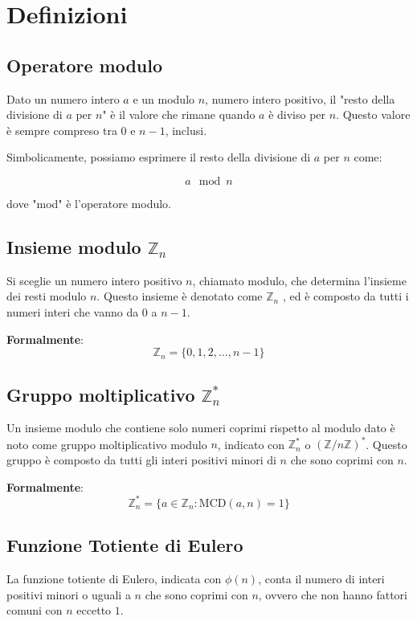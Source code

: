 \documentclass[a4paper,12pt]{report}
\begin{document}
\section{Definizioni} 
\subsection*{Operatore modulo} Dato un numero intero $a$ e un modulo $n$, numero intero positivo, il "resto della divisione di $a$ per $n$" è il valore che rimane quando $a$ è diviso per $n$. Questo valore è sempre compreso tra 0 e $n-1$, inclusi.

Simbolicamente, possiamo esprimere il resto della divisione di $a$ per $n$ come:

\[ a \mod n \]

dove "mod" è l'operatore modulo.

\subsection*{Insieme modulo \( \mathbb{Z}_n\)}
Si sceglie un numero intero positivo \(n\), chiamato modulo, che determina l'insieme dei resti modulo \(n\). 
Questo insieme è denotato come \(\mathbb{Z}_n\)  , ed è composto da tutti i numeri interi che vanno da 0 a \(n-1\).

\textbf{Formalmente}: \[\mathbb{Z}_n = \{0, 1, 2, \ldots, n-1\}\]

\subsection*{Gruppo moltiplicativo \(\mathbb{Z}_n^*\)}
Un insieme modulo che contiene solo numeri coprimi rispetto al modulo dato è noto come gruppo moltiplicativo modulo \(n\), indicato con \(\mathbb{Z}_n^*\) o \((\mathbb{Z}/n\mathbb{Z})^*\). 
Questo gruppo è composto da tutti gli interi positivi minori di \(n\) che sono coprimi con \(n\).

\textbf{Formalmente}: \[\mathbb{Z}_n^* = \{a \in \mathbb{Z}_n : \text{MCD}(a, n) = 1\}\]

\subsection*{Funzione Totiente di Eulero} \label{sec:totiente}
La funzione totiente di Eulero, indicata con $\phi(n)$, conta il numero di interi positivi minori o uguali a $n$ che sono coprimi con $n$, ovvero che non hanno fattori comuni con $n$ eccetto $1$. 
\end{document}
